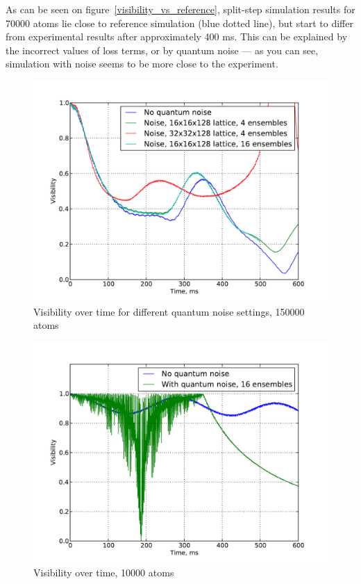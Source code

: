 \documentclass[12pt,notitlepage]{report}
\begin{document}
As can be seen on figure~\ref{visibility_vs_reference},
split-step simulation results for 70000 atoms lie close to reference simulation (blue dotted line),
but start to differ from experimental results after approximately 400 ms.
This can be explained by the incorrect values of loss terms, or by quantum noise --- as you can see,
simulation with noise seems to be more close to the experiment.

\begin{figure}
\includegraphics[width=4.5in]{visibility_150k.pdf}
\caption{Visibility over time for different quantum noise settings, 150000 atoms}
\label{visibility_noise}
\end{figure}

\begin{figure}
\includegraphics[width=4.5in]{visibility_10k.pdf}
\caption{Visibility over time, 10000 atoms}
\label{visibility_noise_10k}
\end{figure}
\end{document}
